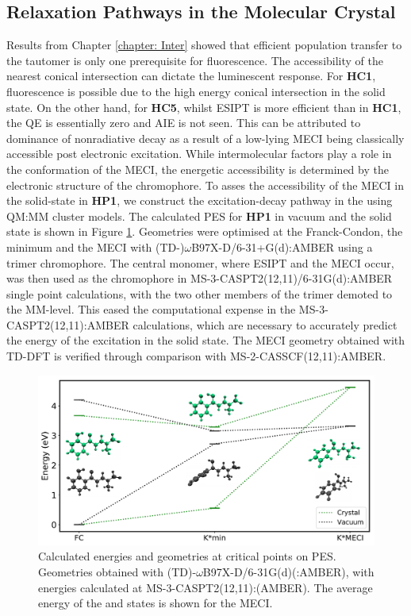 \subsection{Relaxation Pathways in the Molecular Crystal}\label{section: Connecting_Relaxation}
Results from Chapter \ref{chapter: Inter} showed that efficient population transfer to the \Kstar{} tautomer is only one prerequisite for fluorescence. The accessibility of the nearest conical intersection can dictate the luminescent response. For \textbf{HC1}, fluorescence is possible due to the high energy conical intersection in the solid state. On the other hand, for \textbf{HC5}, whilst ESIPT is more efficient than in \textbf{HC1}, the \ac{QE} is essentially zero and AIE is not seen. This can be attributed to dominance of nonradiative decay as a result of a low-lying MECI being classically accessible post electronic excitation. While intermolecular factors play a role in the conformation of the MECI, the energetic accessibility is determined by the electronic structure of the chromophore. To asses the accessibility of the MECI in the solid-state in \textbf{HP1}, we construct the excitation-decay pathway in the using QM:MM cluster models. The calculated PES for \textbf{HP1} in vacuum and the solid state is shown in Figure \ref{figure: HP1_crystal_vs_vac}.
Geometries were optimised at the Franck-Condon, the \Kstar{} minimum and the MECI with (TD-)$\omega$B97X-D/6-31+G(d):AMBER using a trimer chromophore. The central monomer, where ESIPT and the MECI occur, was then used as the chromophore in MS-3-CASPT2(12,11)/6-31G(d):AMBER single point calculations, with the two other members of the trimer demoted to the MM-level. This eased the computational expense in the MS-3-CASPT2(12,11):AMBER calculations, which are necessary to accurately predict the energy of the \sone{} excitation in the solid state. The MECI geometry obtained with TD-DFT is verified through comparison with MS-2-CASSCF(12,11):AMBER.
\begin{figure}[t]
\centering
  \includegraphics[width=0.9\linewidth]{5ConnectingCrystalStructure/HP1_crystal_vs_vac}
  \caption[PES for \textbf{HP1} in vacuum and the solid state]{Calculated energies and geometries at critical points on PES. Geometries obtained with (TD)-$\omega$B97X-D/6-31G(d)(:AMBER), with energies calculated at MS-3-CASPT2(12,11):(AMBER). The average energy of the \sone{} and \szero{} states is shown for the MECI.}
  \label{figure: HP1_crystal_vs_vac}
\end{figure}
